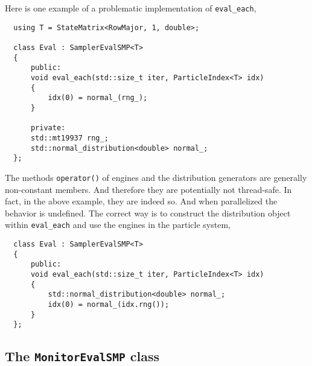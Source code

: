 Here is one example of a problematic implementation of \verb|eval_each|,
\begin{Verbatim}
  using T = StateMatrix<RowMajor, 1, double>;

  class Eval : SamplerEvalSMP<T>
  {
      public:
      void eval_each(std::size_t iter, ParticleIndex<T> idx)
      {
          idx(0) = normal_(rng_);
      }

      private:
      std::mt19937 rng_;
      std::normal_distribution<double> normal_;
  };
\end{Verbatim}
The methods \verb|operator()| of \rng engines and the distribution generators
are generally non-constant members. And therefore they are potentially not
thread-safe. In fact, in the above example, they are indeed so. And when
parallelized the behavior is undefined. The correct way is to construct the
distribution object within \verb|eval_each| and use the \rng engines in the
particle system,
\begin{Verbatim}
  class Eval : SamplerEvalSMP<T>
  {
      public:
      void eval_each(std::size_t iter, ParticleIndex<T> idx)
      {
          std::normal_distribution<double> normal_;
          idx(0) = normal_(idx.rng());
      }
  };
\end{Verbatim}

\subsection{The \texttt{MonitorEvalSMP} class}
\label{sub:he MonitorEvalSMP class}

